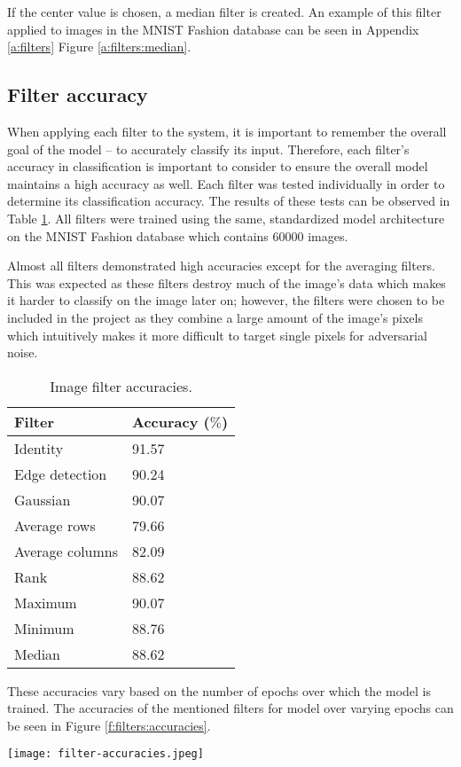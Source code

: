 			If the center value is chosen, a median filter is created. An example of this filter applied to images in the MNIST Fashion database \cite{zalandoresearchFashionMNIST} can be seen in Appendix \ref{a:filters} Figure \ref{a:filters:median}.

	\subsection{Filter accuracy} \label{s:filters:accuracy}
		When applying each filter to the system, it is important to remember the overall goal of the model -- to accurately classify its input. Therefore, each filter's accuracy in classification is important to consider to ensure the overall model maintains a high accuracy as well. Each filter was tested individually in order to determine its classification accuracy. The results of these tests can be observed in Table \ref{t:filterAccuracies}. All filters were trained using the same, standardized model architecture on the MNIST Fashion database \cite{zalandoresearchFashionMNIST} which contains \(60000\) images.

		Almost all filters demonstrated high accuracies except for the averaging filters. This was expected as these filters destroy much of the image's data which makes it harder to classify on the image later on; however, the filters were chosen to be included in the project as they combine a large amount of the image's pixels which intuitively makes it more difficult to target single pixels for adversarial noise.
		\begin{table}
			\begin{center}
				\caption{Image filter accuracies.}
				\label{t:filterAccuracies}
				\begin{tabular}{l|l}\hline
					\textbf{Filter} & \textbf{Accuracy (\(\%\))}\\\hline
					Identity & 91.57\\\hline
					Edge detection & 90.24\\\hline
					Gaussian & 90.07\\\hline
					Average rows & 79.66\\\hline
					Average columns & 82.09\\\hline
					Rank & 88.62\\\hline
					Maximum & 90.07\\\hline
					Minimum & 88.76\\\hline
					Median & 88.62\\\hline
				\end{tabular}
			\end{center}
		\end{table}

		These accuracies vary based on the number of epochs over which the model is trained. The accuracies of the mentioned filters for model over varying epochs can be seen in Figure \ref{f:filters:accuracies}.
		\begin{figure*}
			\texttt{[image: filter-accuracies.jpeg]}
			\caption{Classification accuracy during training for various image filters.}
			\label{f:filters:accuracies}
		\end{figure*}
